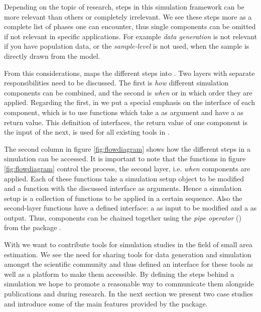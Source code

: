 \documentclass[article]{ajs}
\begin{document}
Depending on the topic of research, steps in this simulation framework can be more relevant than others or completely irrelevant. We see these steps more as a complete list of phases one can encounter, thus single components can be omitted if not relevant in specific applications. For example \textit{data generation} is not relevant if you have population data, or the \textit{sample-level} is not used, when the sample is directly drawn from the model.

From this considerations,  maps the different steps into . Two layers with separate responsibilities need to be discussed. The first is \textit{how} different simulation components can be combined, and the second is \textit{when} or in which order they are applied. Regarding the first, in  we put a special emphasis on the interface of each component, which is to use functions which take a  as argument and have a  as return value. This definition of interfaces, the return value of one component is the input of the next, is used for all existing tools in .

The second column in figure \ref{fig:flowdiagram} shows how the different steps in a simulation can be accessed. It is important to note that the functions in figure \ref{fig:flowdiagram} control the process, the second layer, i.e. \textit{when} components are applied. Each of these functions take a simulation setup object to be modified and a function with the discussed interface as arguments. Hence a simulation setup is a collection of functions to be applied in a certain sequence. Also the second-layer functions have a defined interface: a  as input to be modified and a  as output. Thus, components can be chained together using the \textit{pipe operator} (\proglang{\%>\%}) from the package .

With  we want to contribute tools for simulation studies in the field of small area estimation. We see the need for sharing tools for data generation and simulation amongst the scientific community and thus defined an interface for these tools as well as a platform to make them accessible. By defining the steps behind a simulation we hope to promote a reasonable way to communicate them alongside publications and during research. In the next section we present two case studies and introduce some of the main features provided by the package.
\end{document}
